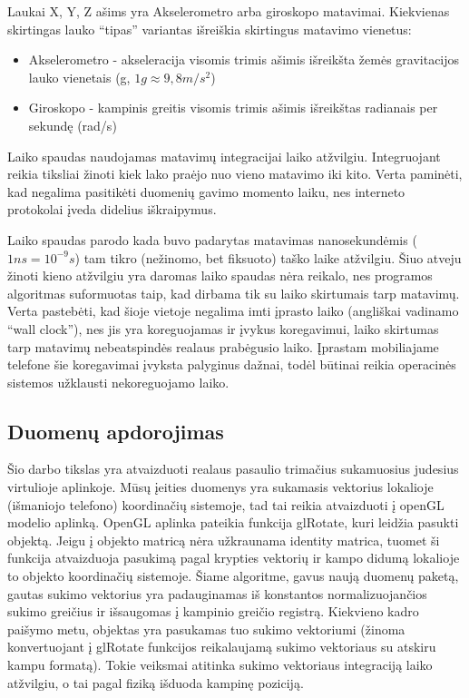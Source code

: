 \documentclass[12pt, a4paper, lithuanian, final]{article}
\begin{document}
Laukai X, Y, Z ašims yra Akselerometro arba giroskopo matavimai. Kiekvienas skirtingas lauko "`tipas"' variantas išreiškia skirtingus matavimo vienetus:
\begin{itemize}
	\item Akselerometro - akseleracija visomis trimis ašimis išreikšta žemės gravitacijos lauko vienetais (g, $1g \approx 9,8 m/s^2$)
	\item Giroskopo - kampinis greitis visomis trimis ašimis išreikštas radianais per sekundę (rad/s)
\end{itemize}

Laiko spaudas naudojamas matavimų integracijai laiko atžvilgiu.
Integruojant reikia tiksliai žinoti kiek lako praėjo nuo vieno matavimo iki kito.
Verta paminėti, kad negalima pasitikėti duomenių gavimo momento laiku, nes interneto protokolai įveda didelius iškraipymus.

Laiko spaudas parodo kada buvo padarytas matavimas nanosekundėmis ($1ns = 10^{-9} s$) tam tikro (nežinomo, bet fiksuoto) taško laike atžvilgiu.
Šiuo atveju žinoti kieno atžvilgiu yra daromas laiko spaudas nėra reikalo, nes programos algoritmas suformuotas taip, kad dirbama tik su laiko skirtumais tarp matavimų.
Verta pastebėti, kad šioje vietoje negalima imti įprasto laiko (angliškai vadinamo "`wall clock"'), nes jis yra koreguojamas ir įvykus koregavimui, laiko skirtumas tarp matavimų nebeatspindės realaus prabėgusio laiko.
Įprastam mobiliajame telefone šie koregavimai įvyksta palyginus dažnai, todėl būtinai reikia operacinės sistemos užklausti nekoreguojamo laiko.


\subsection{Duomenų apdorojimas}

Šio darbo tikslas yra atvaizduoti realaus pasaulio trimačius sukamuosius judesius virtulioje aplinkoje.
Mūsų įeities duomenys yra sukamasis vektorius lokalioje (išmaniojo telefono) koordinačių sistemoje, tad tai reikia atvaizduoti į openGL modelio aplinką.
OpenGL aplinka pateikia funkcija glRotate, kuri leidžia pasukti objektą.
Jeigu į objekto matricą nėra užkraunama identity matrica, tuomet ši funkcija atvaizduoja pasukimą pagal krypties vektorių ir kampo didumą lokalioje to objekto koordinačių sistemoje.
Šiame algoritme, gavus naują duomenų paketą, gautas sukimo vektorius yra padauginamas iš konstantos normalizuojančios sukimo greičius ir išsaugomas į kampinio greičio registrą.
Kiekvieno kadro paišymo metu, objektas yra pasukamas tuo sukimo vektoriumi (žinoma konvertuojant į glRotate funkcijos reikalaujamą sukimo vektoriaus su atskiru kampu formatą).
Tokie veiksmai atitinka sukimo vektoriaus integraciją laiko atžvilgiu, o tai pagal fiziką išduoda kampinę poziciją.
\end{document}
